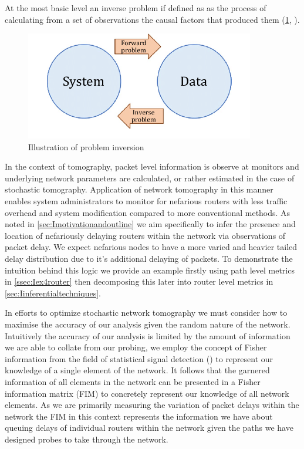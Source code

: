At the most basic level an inverse problem if defined as as the process of calculating from a set of observations the causal factors that produced them (\cref{fig:probleminv}, \cite{sadri_effect_2019}).
\begin{figure}[H]
    \centering
    \includegraphics[width=10cm]{figs/inverse_problems.png}
    \caption[Illustration of problem inversion]{Illustration of problem inversion \cite{sadri_effect_2019}}
    \label{fig:probleminv}
\end{figure}
In the context of tomography, packet level information is observe at monitors and underlying network parameters are calculated, or rather estimated in the case of stochastic tomography. Application of network tomography in this manner enables system administrators to monitor for nefarious routers with less traffic overhead and system modification compared to more conventional methods. As noted in \cref{sec:Imotivationandoutline} we aim specifically to infer the presence and location of nefariously delaying routers within the network via observations of packet delay. We expect nefarious nodes to have a more varied and heavier tailed delay distribution due to it's additional delaying of packets. To demonstrate the intuition behind this logic we provide an example firstly using path level metrics in \cref{ssec:Iex4router} then decomposing this later into router level metrics in \cref{sec:Iinferentialtechniques}.\par
In efforts to optimize stochastic network tomography we must consider how to maximise the accuracy of our analysis given the random nature of the network. Intuitively the accuracy of our analysis is limited by the amount of information we are able to collate from our probing, we employ the concept of Fisher information from the field of statistical signal detection (\cite{poor_introduction_1994}) to represent our knowledge of a single element of the network. It follows that the garnered information of all elements in the network can be presented in a Fisher information matrix (FIM) to concretely represent our knowledge of all network elements. As we are primarily measuring the variation of packet delays within the network the FIM in this context represents the information we have about queuing delays of individual routers within the network given the paths we have designed probes to take through the network.\par
